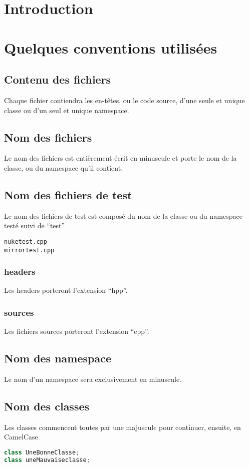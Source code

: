\documentclass[a4paper,11pt]{report}
\begin{document}

\tableofcontents

\chapter{Introduction}



\chapter[Conventions]{Quelques conventions utilisées}
\section{Contenu des fichiers}
Chaque fichier contiendra les en-têtes, ou le code source, d'une seule et unique
classe ou d'un seul et unique namespace.
\section{Nom des fichiers}
Le nom des fichiers est entièrement écrit en minuscule et porte le nom de la
classe, ou du namespace qu'il contient.
\section{Nom des fichiers de test}
Le nom des fichiers de test est composé du nom de la classe ou du namespace
testé suivi de ``test''
\begin{lstlisting}[frame=single]
nuketest.cpp
mirrortest.cpp
\end{lstlisting}
\subsection{headers}
Les headers porteront l'extension ``hpp''.
\subsection{sources}
Les fichiers sources porteront l'extension ``cpp''.
\section{Nom des namespace}
Le nom d'un namespace sera exclusivement en minuscule.
\section{Nom des classes}
Les classes commencent toutes par une majuscule pour continuer, ensuite, en
CamelCase
\begin{lstlisting}[frame=single,language=C++]
class UneBonneClasse;
class uneMauvaiseclasse;
\end{lstlisting}
\end{document}

